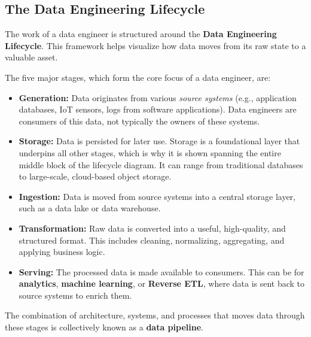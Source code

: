 \documentclass{article}
\begin{document}
\subsection{The Data Engineering Lifecycle}
The work of a data engineer is structured around the \textbf{Data Engineering Lifecycle}. This framework helps visualize how data moves from its raw state to a valuable asset.


The five major stages, which form the core focus of a data engineer, are:
\begin{itemize}
    \item \textbf{Generation:} Data originates from various \textit{source systems} (e.g., application databases, IoT sensors, logs from software applications). Data engineers are consumers of this data, not typically the owners of these systems.
    \item \textbf{Storage:} Data is persisted for later use. Storage is a foundational layer that underpins all other stages, which is why it is shown spanning the entire middle block of the lifecycle diagram. It can range from traditional databases to large-scale, cloud-based object storage.
    \item \textbf{Ingestion:} Data is moved from source systems into a central storage layer, such as a data lake or data warehouse.
    \item \textbf{Transformation:} Raw data is converted into a useful, high-quality, and structured format. This includes cleaning, normalizing, aggregating, and applying business logic.
    \item \textbf{Serving:} The processed data is made available to consumers. This can be for \textbf{analytics}, \textbf{machine learning}, or \textbf{Reverse ETL}, where data is sent back to source systems to enrich them.
\end{itemize}
The combination of architecture, systems, and processes that moves data through these stages is collectively known as a \textbf{data pipeline}.
\end{document}
